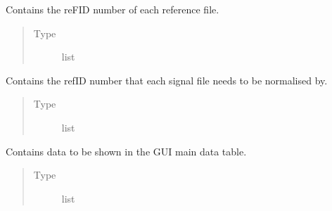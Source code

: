 \documentclass[a4paper,10pt,english]{sphinxmanual}
\begin{document}
\begin{fulllineitems}
\begin{fulllineitems}
\begin{quote}
\begin{description}
\end{description}\end{quote}

\end{fulllineitems}


\begin{fulllineitems}
\label{\detokenize{sfgtools:sfgtools.SFGProcessTools.ref_num}}
\sphinxAtStartPar
Contains the reFID number of each reference file.
\begin{quote}\begin{description}
\item[{Type}] \leavevmode
\sphinxAtStartPar
list

\end{description}\end{quote}

\end{fulllineitems}


\begin{fulllineitems}
\label{\detokenize{sfgtools:sfgtools.SFGProcessTools.sig_ref_num}}
\sphinxAtStartPar
Contains the refID number that each signal file needs to be normalised by.
\begin{quote}\begin{description}
\item[{Type}] \leavevmode
\sphinxAtStartPar
list

\end{description}\end{quote}

\end{fulllineitems}


\begin{fulllineitems}
\label{\detokenize{sfgtools:sfgtools.SFGProcessTools.tabledata}}
\sphinxAtStartPar
Contains data to be shown in the GUI main data table.
\begin{quote}\begin{description}
\item[{Type}] \leavevmode
\sphinxAtStartPar
list


\end{description}
\end{quote}
\end{fulllineitems}
\end{fulllineitems}
\end{document}

